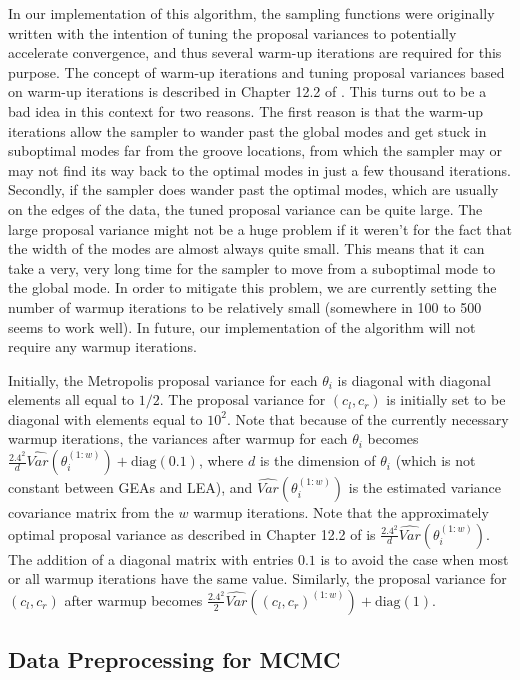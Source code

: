 \documentclass[12pt]{article}
\begin{document}
In our implementation of this algorithm, the sampling functions were
originally written with the intention of tuning the proposal variances
to potentially accelerate convergence, and thus several warm-up
iterations are required for this purpose. The concept of warm-up
iterations and tuning proposal variances based on warm-up iterations is
described in Chapter 12.2 of \citep{gelman2013}. This turns out to be a
bad idea in this context for two reasons. The first reason is that the
warm-up iterations allow the sampler to wander past the global modes and
get stuck in suboptimal modes far from the groove locations, from which
the sampler may or may not find its way back to the optimal modes in
just a few thousand iterations. Secondly, if the sampler does wander
past the optimal modes, which are usually on the edges of the data, the
tuned proposal variance can be quite large. The large proposal variance
might not be a huge problem if it weren't for the fact that the width of
the modes are almost always quite small. This means that it can take a
very, very long time for the sampler to move from a suboptimal mode to
the global mode. In order to mitigate this problem, we are currently
setting the number of warmup iterations to be relatively small
(somewhere in 100 to 500 seems to work well). In future, our
implementation of the algorithm will not require any warmup iterations.

Initially, the Metropolis proposal variance for each \(\theta_i\) is
diagonal with diagonal elements all equal to \(1/2\). The proposal
variance for \((c_l, c_r)\) is initially set to be diagonal with
elements equal to \(10^2\). Note that because of the currently necessary
warmup iterations, the variances after warmup for each \(\theta_i\)
becomes
\(\frac{2.4^2}{d}\hat{Var}(\theta_i^{(1:w)}) + \text{diag}(0.1)\), where
\(d\) is the dimension of \(\theta_i\) (which is not constant between
GEAs and LEA), and \(\hat{Var}(\theta_i^{(1:w)})\) is the estimated
variance covariance matrix from the \(w\) warmup iterations. Note that
the approximately optimal proposal variance as described in Chapter 12.2
of \citep{gelman2013} is \(\frac{2.4^2}{d}\hat{Var}(\theta_i^{(1:w)})\).
The addition of a diagonal matrix with entries \(0.1\) is to avoid the
case when most or all warmup iterations have the same value. Similarly,
the proposal variance for \((c_l, c_r)\) after warmup becomes
\(\frac{2.4^2}{2}\hat{Var}((c_l,c_r)^{(1:w)}) + \text{diag}(1)\).

\subsection{Data Preprocessing for MCMC}
\end{document}
